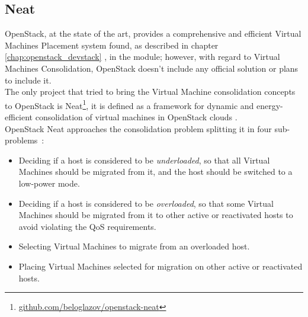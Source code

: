 \subsection{Neat}
\label{sec:sota_neat}
OpenStack, at the state of the art, provides a comprehensive and efficient Virtual Machines Placement system found, as described in chapter \ref{chap:openstack_devstack} , in the  module; however, with regard to Virtual Machines Consolidation, OpenStack doesn't include any official solution or plans to include it.\\
The only project that tried to bring the Virtual Machine consolidation concepts to OpenStack is Neat\footnote{\url{github.com/beloglazov/openstack-neat}}, it is defined as a framework for dynamic and energy-efficient consolidation of virtual machines in OpenStack clouds \cite{beloglazov2014openstack}.\\
OpenStack Neat approaches the consolidation problem splitting it in four sub-problems~\cite[p.~3]{beloglazov2014openstack}:
\begin{itemize}
  \item  Deciding if a host is considered to be \textit{underloaded}, so that all Virtual Machines should be migrated from it, and the host should be switched to a low-power mode. 
  \item Deciding if a host is considered to be \textit{overloaded}, so that some Virtual Machines should be migrated from it to other active or reactivated hosts to avoid violating the QoS requirements.
  \item Selecting  Virtual Machines to migrate from an overloaded host.
  \item Placing  Virtual Machines selected for migration on other active or reactivated hosts.
\end{itemize}


